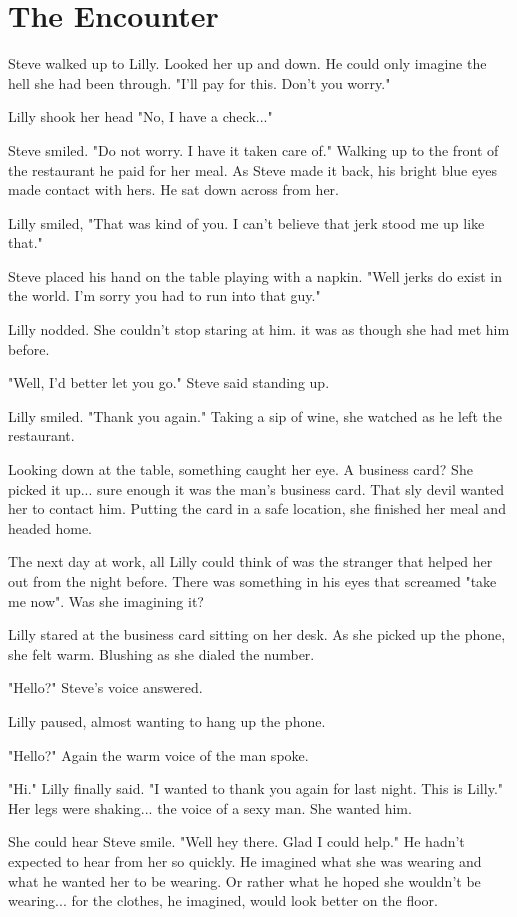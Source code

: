 \section{The Encounter}

Steve walked up to Lilly. Looked her up and down. He could only imagine the hell she had been through. "I'll pay for this. Don't you worry."

Lilly shook her head "No, I have a check..."

Steve smiled. "Do not worry. I have it taken care of." Walking up to the front of the restaurant he paid for her meal. As Steve made it back, his bright blue eyes made contact with hers. He sat down across from her.

Lilly smiled, "That was kind of you. I can't believe that jerk stood me up like that."

Steve placed his hand on the table playing with a napkin. "Well jerks do exist in the world. I'm sorry you had to run into that guy."

Lilly nodded. She couldn't stop staring at him. it was as though she had met him before.

"Well, I'd better let you go." Steve said standing up.

Lilly smiled. "Thank you again." Taking a sip of wine, she watched as he left the restaurant.

Looking down at the table, something caught her eye. A business card? She picked it up... sure enough it was the man's business card. That sly devil wanted her to contact him. Putting the card in a safe location, she finished her meal and headed home.

The next day at work, all Lilly could think of was the stranger that helped her out from the night before. There was something in his eyes that screamed "take me now". Was she imagining it?

Lilly stared at the business card sitting on her desk. As she picked up the phone, she felt warm. Blushing as she dialed the number.

"Hello?" Steve's voice answered.

Lilly paused, almost wanting to hang up the phone.

"Hello?" Again the warm voice of the man spoke.

"Hi." Lilly finally said. "I wanted to thank you again for last night. This is Lilly." Her legs were shaking... the voice of a sexy man. She wanted him.

She could hear Steve smile. "Well hey there. Glad I could help." He hadn't expected to hear from her so quickly. He imagined what she was wearing and what he wanted her to be wearing. Or rather what he hoped she wouldn't be wearing... for the clothes, he imagined, would look better on the floor.

